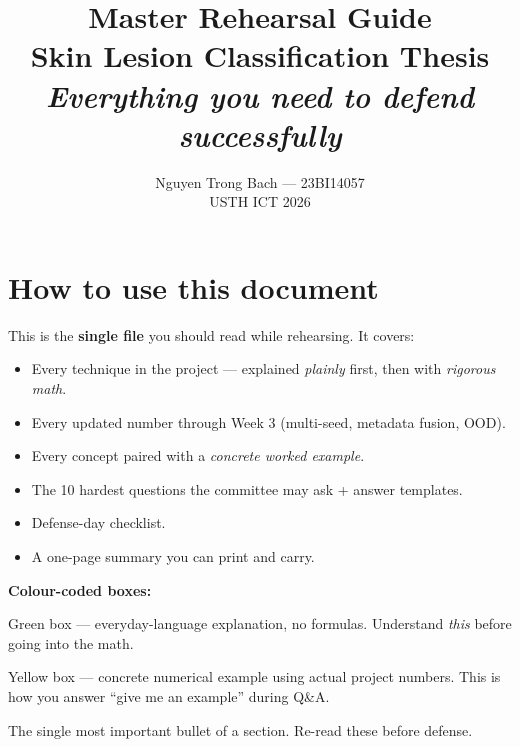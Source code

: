 \documentclass[11pt,a4paper]{article}
\title{
  \vspace{-1.5cm}
  \color{usthblue}\Huge\textbf{Master Rehearsal Guide}\\[6pt]
  \color{black!75}\large Skin Lesion Classification Thesis\\[2pt]
  \normalsize\textit{Everything you need to defend successfully}
}
\author{Nguyen Trong Bach --- 23BI14057 \\[2pt]\small USTH ICT 2026}
\date{}
\begin{document}
\maketitle
\vspace{-1cm}

{\hypersetup{linkcolor=black}\tableofcontents}

\newpage

\section{How to use this document}

\begin{idea}[Orientation]
This is the \textbf{single file} you should read while rehearsing. It covers:
\begin{itemize}[leftmargin=*]
  \item Every technique in the project --- explained \textit{plainly} first, then with \textit{rigorous math}.
  \item Every updated number through Week 3 (multi-seed, metadata fusion, OOD).
  \item Every concept paired with a \textit{concrete worked example}.
  \item The 10 hardest questions the committee may ask + answer templates.
  \item Defense-day checklist.
  \item A one-page summary you can print and carry.
\end{itemize}
\end{idea}

\textbf{Colour-coded boxes:}

\begin{simple}
Green box --- everyday-language explanation, no formulas. Understand \textit{this} before going into the math.
\end{simple}

\begin{example}
Yellow box --- concrete numerical example using actual project numbers. This is how you answer ``give me an example'' during Q\&A.
\end{example}

\begin{idea}
The single most important bullet of a section. Re-read these before defense.
\end{idea}
\end{document}
